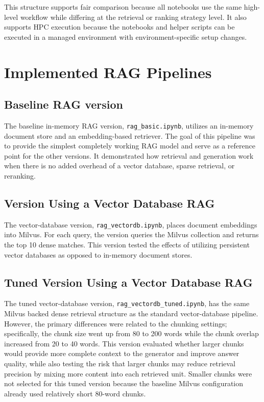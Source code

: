 This structure supports fair comparison because all notebooks use the same high-level workflow while differing at the retrieval or ranking strategy level. It also supports \ac{HPC} execution because the notebooks and helper scripts can be executed in a managed environment with environment-specific setup changes.

\section{Implemented RAG Pipelines}

\subsection{Baseline RAG version}
The baseline in-memory RAG version, \texttt{rag\_basic.ipynb}, utilizes an in-memory document store and an embedding-based retriever. The goal of this pipeline was to provide the simplest completely working \ac{RAG} model and serve as a reference point for the other versions. It demonstrated how retrieval and generation work when there is no added overhead of a vector database, sparse retrieval, or reranking.

\subsection{Version Using a Vector Database RAG}

The vector-database version, \texttt{rag\_vectordb.ipynb}, places document embeddings into Milvus. For each query, the version queries the Milvus collection and returns the top 10 dense matches. This version tested the effects of utilizing persistent vector databases as opposed to in-memory document stores.

\subsection{Tuned Version Using a Vector Database RAG}

The tuned vector-database version, \texttt{rag\_vectordb\_tuned.ipynb}, has the same Milvus backed dense retrieval structure as the standard vector-database pipeline. However, the primary differences were related to the chunking settings; specifically, the chunk size went up from 80 to 200 words while the chunk overlap increased from 20 to 40 words. This version evaluated whether larger chunks would provide more complete context to the generator and improve answer quality, while also testing the risk that larger chunks may reduce retrieval precision by mixing more content into each retrieved unit. Smaller chunks were not selected for this tuned version because the baseline Milvus configuration already used relatively short 80-word chunks.

